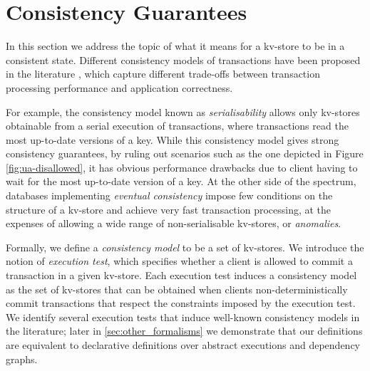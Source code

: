 \section{Consistency Guarantees}
\label{sec:cm}
In this section we address the topic of what it means for a kv-store 
to be in a consistent state. Different consistency models of transactions have 
been proposed in the literature \cite{ev_principles,rola,cops,redblue,PSI,clocksi}, which capture different trade-offs 
between transaction processing performance and application correctness. 

For example, the consistency model known as \emph{serialisability} allows only kv-stores 
obtainable from a serial execution of transactions, where transactions read the most up-to-date 
versions of a key. While this consistency model gives strong consistency guarantees, by ruling out scenarios 
such as the one depicted in Figure \ref{fig:ua-disallowed}, it has obvious performance drawbacks due to client 
having to wait for the most up-to-date version of a key. At the other side of the spectrum, databases 
implementing \emph{eventual consistency} impose few conditions on the structure of a kv-store 
and achieve very fast transaction processing, at the expenses 
of allowing a wide range of non-serialisable kv-stores, or \emph{anomalies}.

Formally, we define a \emph{consistency model} to be a set of kv-stores. We introduce the notion of 
\emph{execution test}, which specifies whether a client is allowed to commit a transaction in a given 
kv-store. Each execution test induces a consistency model as the set of kv-stores that 
can be obtained when clients non-deterministically commit transactions that respect the constraints 
imposed by the execution test. We identify several execution tests that induce well-known consistency 
models in the literature; later in \cref{sec:other_formalisms} we demonstrate that our definitions are equivalent 
to declarative definitions over abstract executions and dependency graphs.





